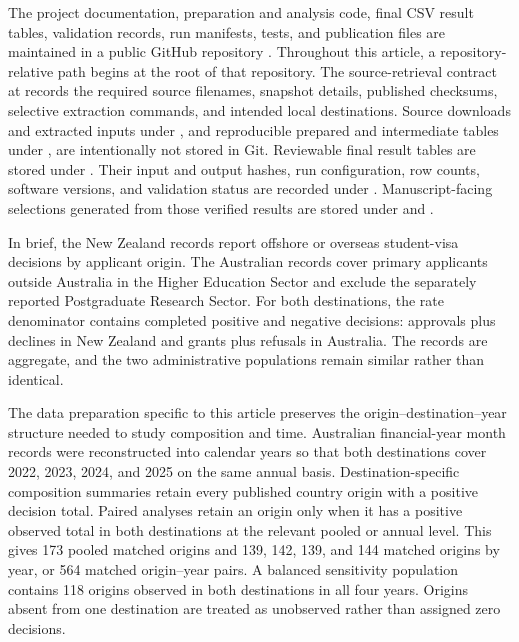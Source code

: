 \documentclass[runningheads]{llncs}
\begin{document}
The project documentation, preparation and analysis code, final CSV result tables, validation records, run manifests, tests, and publication files are maintained in a public GitHub repository \cite{Kaplan2026UnderstandingAUNZRepository}. Throughout this article, a repository-relative path begins at the root of that repository. The source-retrieval contract at  records the required source filenames, snapshot details, published checksums, selective extraction commands, and intended local destinations. Source downloads and extracted inputs under , and reproducible prepared and intermediate tables under , are intentionally not stored in Git. Reviewable final result tables are stored under . Their input and output hashes, run configuration, row counts, software versions, and validation status are recorded under . Manuscript-facing selections generated from those verified results are stored under  and .

In brief, the New Zealand records report offshore or overseas student-visa decisions by applicant origin. The Australian records cover primary applicants outside Australia in the Higher Education Sector and exclude the separately reported Postgraduate Research Sector. For both destinations, the rate denominator contains completed positive and negative decisions: approvals plus declines in New Zealand and grants plus refusals in Australia. The records are aggregate, and the two administrative populations remain similar rather than identical.

The data preparation specific to this article preserves the origin--destination--year structure needed to study composition and time. Australian financial-year month records were reconstructed into calendar years so that both destinations cover 2022, 2023, 2024, and 2025 on the same annual basis. Destination-specific composition summaries retain every published country origin with a positive decision total. Paired analyses retain an origin only when it has a positive observed total in both destinations at the relevant pooled or annual level. This gives 173 pooled matched origins and 139, 142, 139, and 144 matched origins by year, or 564 matched origin--year pairs. A balanced sensitivity population contains 118 origins observed in both destinations in all four years. Origins absent from one destination are treated as unobserved rather than assigned zero decisions.
\end{document}
